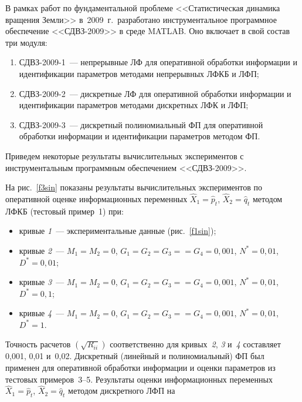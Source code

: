 \begin{multicols}{2}
В рамках работ по фундаментальной проблеме <<Статистическая динамика вращения Земли>> в~2009~г.\ 
разработано инструментальное програм\-мное обеспечение <<СДВЗ-2009>> в среде MATLAB. Оно включает 
в свой состав три модуля:
\begin{enumerate}[(1)]
\item СДВЗ-2009-1~--- непрерывные ЛФ для оперативной обработки информации и идентификации параметров 
методами непрерывных ЛФКБ и ЛФП;
\item
СДВЗ-2009-2~--- дискретные ЛФ для оперативной обработки информации и идентификации параметров методами 
дискретных ЛФК и ЛФП;
\item
СДВЗ-2009-3~--- дискретный полиномиальный ФП для оперативной обработки информации и идентификации параметров методом ФП.
\end{enumerate}

Приведем некоторые результаты вычислительных экспериментов с инструментальным программным обеспечением <<СДВЗ-2009>>.


На рис.~\ref{f3sin} показаны результаты вычислительных экспериментов по оперативной 
оценке информационных переменных  $\hat X_1=\hat p_t$, $\hat X_2 = \hat q_t$ методом ЛФКБ 
(тестовый пример~1) при:
\begin{itemize}
\item
кривые \textit{1}~--- экспериментальные данные (рис.~\ref{f1sin});
\item
кривые \textit{2}~--- $M_1=M_2=0$, $G_1=G_2=G_3=$\linebreak $=G_4=0,001$, $N^*=0,01$, $D^*=0,01$;
\item
кривые \textit{3}~--- $M_1=M_2=0$, $G_1=G_2=G_3=$\linebreak $=G_4=0,001$, $N^*=0,01$, $D^*=0,1$;
\item
кривые \textit{4}~--- $M_1=M_2=0$, $G_1=G_2=G_3=$\linebreak $=G_4=0,001$, $N^*=0,01$, $D^*=1$.
\end{itemize}

Точность расчетов $\left(\sqrt{R_{ii}}\right)$ соответственно для кривых~\textit{2}, \textit{3} и~\textit{4} 
составляет 0,001, 0,01 и~0,02.
Дискретный (линейный и полиномиальный) ФП был применен для оперативной обработки информации 
и оценки параметров из тестовых примеров~3--5. Результаты оценки информационных переменных 
$\hat X_1=\hat p_t$, $\hat X_2=\hat q_t$ методом дискретного ЛФП на\linebreak\vspace*{-12pt}
\pagebreak
\end{multicols}

